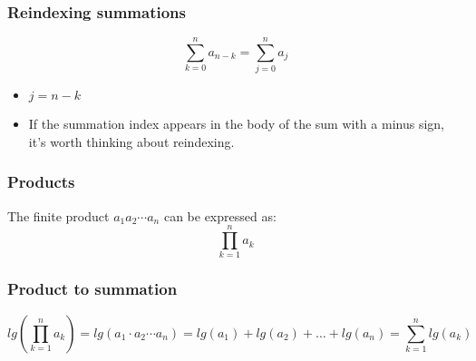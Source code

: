     \subsubsection{Reindexing summations}
        \begin{intuition}
            \begin{equation}
                \sum_{k=0}^{n} a_{n-k} = \sum_{j=0}^{n} a_j 
            \end{equation}
            \begin{itemize}
                \item $j = n-k$
            \end{itemize}

            \begin{itemize}
                \item If the summation index appears in the body of the sum with a minus sign, it's worth thinking about reindexing.
            \end{itemize}
        \end{intuition}

    \subsubsection{Products}
        \begin{definition}
            The finite product $a_1 a_2 \cdots a_n$ can be expressed as: 
            \begin{equation}
                \prod_{k=1}^{n} a_k
            \end{equation}
        \end{definition}

    \subsubsection{Product to summation}
        \begin{definition}
            \begin{equation}
                lg \left( \prod_{k=1}^{n} a_k \right) = lg \left( a_1 \cdot a_2 \cdots a_n \right) = lg(a_1) + lg(a_2) + \ldots + lg(a_n) = \sum_{k=1}^{n} lg(a_k)
            \end{equation}
        \end{definition}